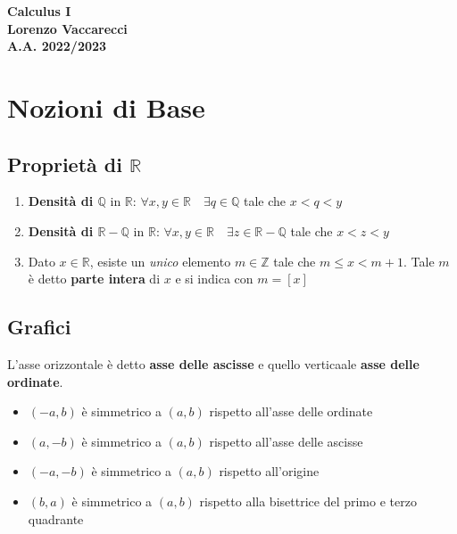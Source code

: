 \documentclass[12pt, a4paper]{report}
\begin{document}
    \begin{titlepage}
        \centering
        \vfill
        {\bfseries\Huge
            Calculus I\\
            \vskip1cm
            \Large
            Lorenzo Vaccarecci\\
            \vskip1cm
            \normalsize
            A.A. 2022/2023
        }
        \vfill
        \vfill
        \vfill
    \end{titlepage}
    \tableofcontents
    \chapter{Nozioni di Base}
    \section{Proprietà di $\mathbb{R}$}
    \begin{enumerate}
        \item \textbf{Densità di $\mathbb{Q} \text{ in } \mathbb{R}$}: $\forall x,y \in \mathbb{R} \quad \exists q \in \mathbb{Q}$ tale che $x<q<y$
        \item \textbf{Densità di $\mathbb{R}-\mathbb{Q} \text{ in } \mathbb{R}$}: $\forall x,y \in \mathbb{R} \quad \exists z \in \mathbb{R}-\mathbb{Q}$ tale che $x<z<y$
        \item Dato $x \in \mathbb{R}$, esiste un \textit{unico} elemento $m \in \mathbb{Z}$ tale che $m \leq x < m+1$. Tale $m$ è detto \textbf{parte intera} di $x$ e si indica con $m=[x]$
    \end{enumerate}
    \section{Grafici}
    L'asse orizzontale è detto \textbf{asse delle ascisse} e quello verticaale \textbf{asse delle ordinate}.
    \begin{itemize}
        \item $(-a,b)$ è simmetrico a $(a,b)$ rispetto all'asse delle ordinate
        \item $(a,-b)$ è simmetrico a $(a,b)$ rispetto all'asse delle ascisse
        \item $(-a,-b)$ è simmetrico a $(a,b)$ rispetto all'origine
        \item $(b,a)$ è simmetrico a $(a,b)$ rispetto alla bisettrice del primo e terzo quadrante
    \end{itemize}
\end{document}
